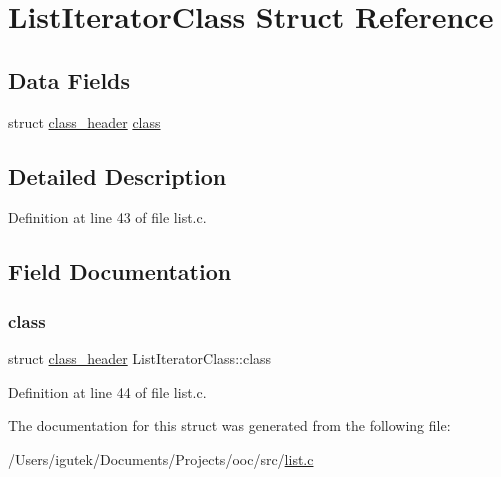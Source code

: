 \hypertarget{structListIteratorClass}{}\section{List\+Iterator\+Class Struct Reference}
\label{structListIteratorClass}
\subsection*{Data Fields}
\begin{DoxyCompactItemize}
\item 
struct \mbox{\hyperlink{structclass__header}{class\+\_\+header}} \mbox{\hyperlink{structListIteratorClass_a2bcc85fff2e5dc6d0a984dc1f1536a78}{class}}
\end{DoxyCompactItemize}


\subsection{Detailed Description}


Definition at line 43 of file list.\+c.



\subsection{Field Documentation}
\mbox{\label{structListIteratorClass_a2bcc85fff2e5dc6d0a984dc1f1536a78}} 
\subsubsection{\texorpdfstring{class}{class}}
{\footnotesize\ttfamily struct \mbox{\hyperlink{structclass__header}{class\+\_\+header}} List\+Iterator\+Class\+::class}



Definition at line 44 of file list.\+c.



The documentation for this struct was generated from the following file\+:\begin{DoxyCompactItemize}
\item 
/\+Users/igutek/\+Documents/\+Projects/ooc/src/\mbox{\hyperlink{list_8c}{list.\+c}}\end{DoxyCompactItemize}
